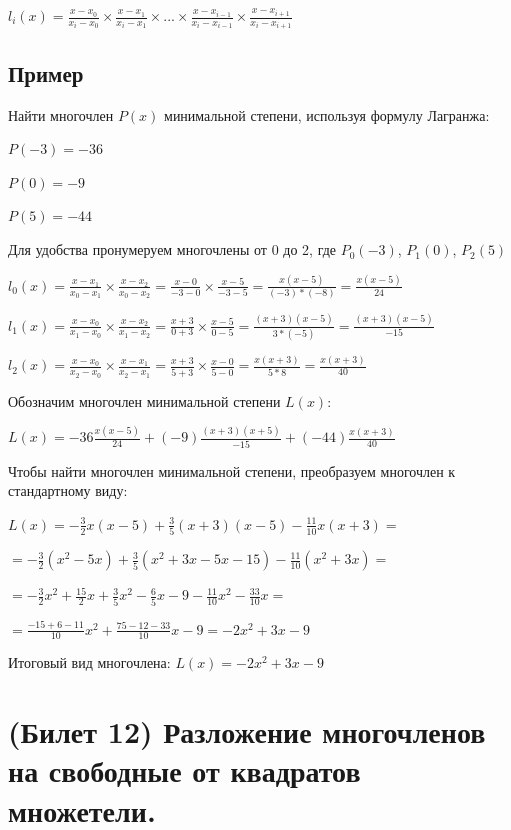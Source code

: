 \documentclass[12pt]{article}
\begin{document}
    $l_i(x) = \frac{x-x_0}{x_i-x_0} \times \frac{x-x_1}{x_i-x_1} \times ... \times \frac{x-x_{i-1}}{x_i-x_{i-1}} \times \frac{x-x_{i+1}}{x_i-x_{i+1}}$

    \subsection{Пример}
    Найти многочлен $P(x)$ минимальной степени, используя формулу Лагранжа:

    $P(-3) = -36$

    $P(0) = -9$

    $P(5) = -44$

    Для удобства пронумеруем многочлены от 0 до 2, где $P_0(-3)$, $P_1(0)$, $P_2(5)$

    $l_0(x) = \frac{x-x_1}{x_0-x_1} \times \frac{x-x_2}{x_0-x_2} = \frac{x-0}{-3-0} \times \frac{x-5}{-3-5} = \frac{x(x-5)}{(-3)*(-8)} = \frac{x(x-5)}{24}$

    $l_1(x) = \frac{x-x_0}{x_1-x_0} \times \frac{x-x_2}{x_1-x_2} = \frac{x+3}{0+3} \times \frac{x-5}{0-5} = \frac{(x+3)(x-5)}{3*(-5)} = \frac{(x+3)(x-5)}{-15}$

    $l_2(x) = \frac{x-x_0}{x_2-x_0} \times \frac{x-x_1}{x_2-x_1} = \frac{x+3}{5+3} \times \frac{x-0}{5-0} = \frac{x(x+3)}{5*8} = \frac{x(x+3)}{40}$

    Обозначим многочлен минимальной степени $L(x)$:

    $L(x) = -36\frac{x(x-5)}{24} + (-9)\frac{(x+3)(x+5)}{-15} + (-44)\frac{x(x+3)}{40}$

    Чтобы найти многочлен минимальной степени, преобразуем многочлен к стандартному виду:

    $L(x) = -\frac{3}{2}x(x-5) + \frac{3}{5}(x+3)(x-5) - \frac{11}{10}x(x+3) =$

    $= -\frac{3}{2}(x^2-5x) + \frac{3}{5}(x^2+3x-5x-15) - \frac{11}{10}(x^2+3x) =$

    $= -\frac{3}{2}x^2 + \frac{15}{2}x + \frac{3}{5}x^2 - \frac{6}{5}x - 9 - \frac{11}{10}x^2 - \frac{33}{10}x =$

    $= \frac{-15+6-11}{10}x^2 + \frac{75-12-33}{10}x - 9 = -2x^2 + 3x - 9$

    Итоговый вид многочлена: $L(x) = -2x^2 + 3x - 9$

    \setcounter{section}{11}

    \section{(Билет 12) Разложение многочленов на свободные от квадратов множетели.}
\end{document}
